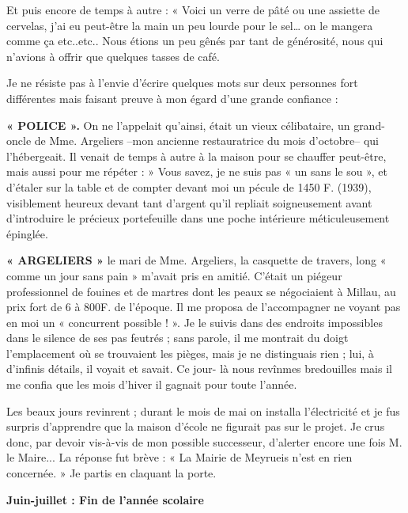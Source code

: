 Et puis encore de temps à autre : « Voici un verre de pâté ou une assiette de cervelas,
j’ai eu peut-être la main un peu lourde pour le sel… on le mangera comme ça
etc..etc.. Nous étions un peu gênés par tant de générosité, nous qui n’avions à
offrir que quelques tasses de café.

Je ne résiste pas à l’envie d’écrire quelques mots sur deux personnes fort différentes
mais faisant preuve à mon égard d’une grande confiance :

\textbf{« POLICE ».} On ne l’appelait qu’ainsi, était un vieux célibataire, un grand-oncle de
Mme. Argeliers --mon ancienne restauratrice du mois d’octobre-- qui l’hébergeait. Il
venait de temps à autre à la maison pour se chauffer peut-être, mais aussi pour me
répéter : » Vous savez, je ne suis pas « un sans le sou », et d’étaler sur la table et de
compter devant moi un pécule de 1450 F. (1939), visiblement heureux devant tant
d’argent qu’il repliait soigneusement avant d’introduire le précieux portefeuille dans
une poche intérieure méticuleusement épinglée.


\textbf{« ARGELIERS »} le mari de Mme. Argeliers, la casquette de travers, long « comme
un jour sans pain » m’avait pris en amitié. C’était un piégeur professionnel de fouines
et de martres dont les peaux se négociaient à Millau, au prix fort de 6 à 800F. de
l’époque. Il me proposa de l’accompagner ne voyant pas en moi un « concurrent
possible ! ». Je le suivis dans des endroits impossibles dans le silence de ses pas
feutrés ; sans parole, il me montrait du doigt l’emplacement où se trouvaient les
pièges, mais je ne distinguais rien ; lui, à d’infinis détails, il voyait et savait. Ce jour-
là nous revînmes bredouilles mais il me confia que les mois d’hiver il gagnait pour
toute l’année.

Les beaux jours revinrent ; durant le mois de mai on installa l’électricité et je fus
surpris d’apprendre que la maison d’école ne figurait pas sur le projet. Je crus donc,
par devoir vis-à-vis de mon possible successeur, d’alerter encore une fois M. le
Maire... La réponse fut brève : « La Mairie de Meyrueis n’est en rien concernée. » Je
partis en claquant la porte.

\begin{center}
\textbf{Juin-juillet : Fin de l’année scolaire}
\end{center}

